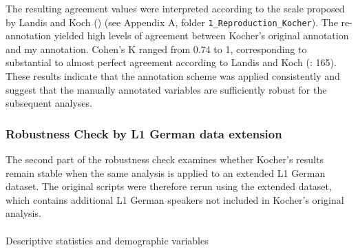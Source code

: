 \documentclass[
  letterpaper,
  DIV=11,
  numbers=noendperiod]{scrartcl}
\makeatletter
\let\oldparagraph\paragraph
\renewcommand{\paragraph}{
    \@ifstar
      \xxxParagraphStar
      \xxxParagraphNoStar
  }
\newcommand{\xxxParagraphStar}[1]{\oldparagraph*{#1}\mbox{}}
\newcommand{\xxxParagraphNoStar}[1]{\oldparagraph{#1}\mbox{}}
\makeatother
\begin{document}
The resulting agreement values were interpreted according to the scale
proposed by Landis and Koch () (see
Appendix A, folder \texttt{1\_Reproduction\_Kocher}). The re-annotation
yielded high levels of agreement between Kocher's original annotation
and my annotation. Cohen's K ranged from 0.74 to 1, corresponding to
substantial to almost perfect agreement according to Landis and Koch
(: 165). These results indicate that
the annotation scheme was applied consistently and suggest that the
manually annotated variables are sufficiently robust for the subsequent
analyses.

\subsubsection{Robustness Check by L1 German data
extension}\label{robustness-check-by-l1-german-data-extension}

The second part of the robustness check examines whether Kocher's
results remain stable when the same analysis is applied to an extended
L1 German dataset. The original scripts were therefore rerun using the
extended dataset, which contains additional L1 German speakers not
included in Kocher's original analysis.

\paragraph{Descriptive statistics and demographic
variables}\label{descriptive-statistics-and-demographic-variables-1}
\end{document}
